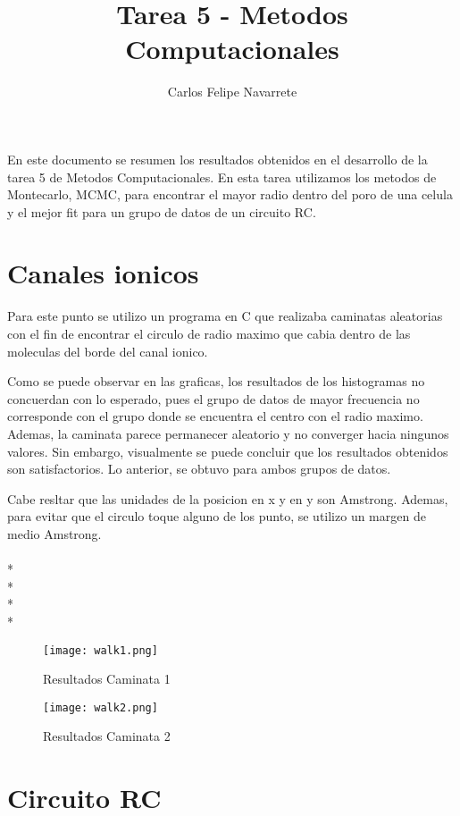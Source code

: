 \documentclass[12pt]{article}
\title{Tarea 5 - Metodos Computacionales}
\author{Carlos Felipe Navarrete}
\begin{document}
\maketitle
En este documento se resumen los resultados obtenidos en el desarrollo de la tarea 5 de Metodos Computacionales. En esta tarea utilizamos los metodos de Montecarlo, MCMC, para encontrar el mayor radio dentro del poro de una celula y el mejor fit para un grupo de datos de un circuito RC.

\section{Canales ionicos}

Para este punto se utilizo un programa en C que realizaba caminatas aleatorias con el fin de encontrar el circulo de radio maximo que cabia dentro de las moleculas del borde del canal ionico.

Como se puede observar en las graficas, los resultados de los histogramas no concuerdan con lo esperado, pues el grupo de datos de mayor frecuencia no corresponde con el grupo donde se encuentra el centro con el radio maximo. Ademas, la caminata parece permanecer aleatorio y no converger hacia ningunos valores. Sin embargo, visualmente se puede concluir que los resultados obtenidos son satisfactorios. Lo anterior, se obtuvo para ambos grupos de datos.

Cabe resltar que las unidades de la posicion en x y en y son Amstrong. Ademas, para evitar que el circulo toque alguno de los punto, se utilizo un margen de medio Amstrong.\\
\\*
\\*
\\*
\\*


\begin{figure}
\begin{center}
\texttt{[image: walk1.png]}
\end{center}
\caption{Resultados Caminata 1}
\end{figure}

\begin{figure}
\begin{center}
\texttt{[image: walk2.png]}
\end{center}
\caption{Resultados Caminata 2}
\end{figure}

\section{Circuito RC}
\end{document}
